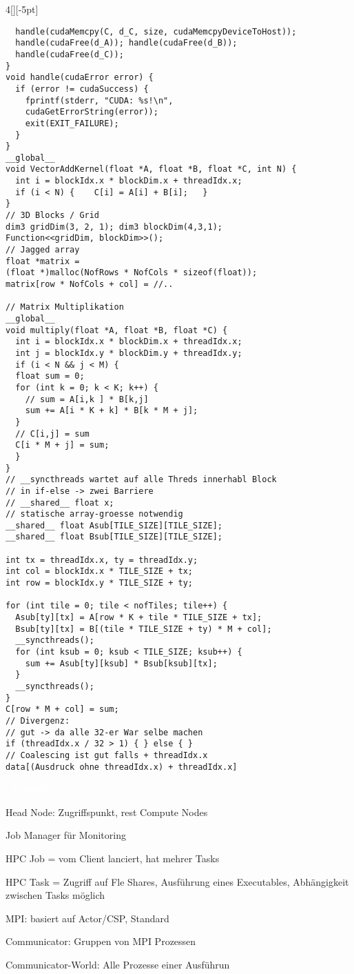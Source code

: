 \documentclass[%
	pdftex,%
	a4paper,%
	landscape,%
	ngerman,
	oneside,%
	6pt,%
	halfparskip,%
]{scrbook}
\newenvironment{mainbox}{%
  \def\FrameCommand{\fboxrule 1px \fcolorbox{black}{spec_blue}}%
  \MakeFramed {\advance\hsize-\width \FrameRestore}}%
 {\endMakeFramed}
\newcommand{\maintopic}[1]{\setcounter{subtopicenum}{0}\setcounter{subsubtopicenum}{0}\vspace{-4px}\begin{mainbox}\textcolor{white}{\textbf{\large{\stepcounter{maintopicenum}\Roman{maintopicenum}. #1}}}\end{mainbox}\vspace{-4px}}
\newenvironment{tight-itemize}
{ \begin{itemize}
    \setlength{\itemsep}{0px}
    \setlength{\parskip}{0px}
    \setlength{\parsep}{0px}  }
{ \end{itemize}                  }
\begin{document}
\begin{multicols}{4}[][-5pt]
\begin{lstlisting}
  handle(cudaMemcpy(C, d_C, size, cudaMemcpyDeviceToHost));
  handle(cudaFree(d_A)); handle(cudaFree(d_B));
  handle(cudaFree(d_C));
}
void handle(cudaError error) {
  if (error != cudaSuccess) {
    fprintf(stderr, "CUDA: %s!\n",
    cudaGetErrorString(error));
    exit(EXIT_FAILURE);
  }
}
__global__
void VectorAddKernel(float *A, float *B, float *C, int N) {
  int i = blockIdx.x * blockDim.x + threadIdx.x;
  if (i < N) {    C[i] = A[i] + B[i];   }
}
// 3D Blocks / Grid
dim3 gridDim(3, 2, 1); dim3 blockDim(4,3,1);
Function<<gridDim, blockDim>>();
// Jagged array
float *matrix =
(float *)malloc(NofRows * NofCols * sizeof(float));
matrix[row * NofCols + col] = //..

// Matrix Multiplikation
__global__
void multiply(float *A, float *B, float *C) {
  int i = blockIdx.x * blockDim.x + threadIdx.x;
  int j = blockIdx.y * blockDim.y + threadIdx.y;
  if (i < N && j < M) {
  float sum = 0;
  for (int k = 0; k < K; k++) {
    // sum = A[i,k ] * B[k,j]
    sum += A[i * K + k] * B[k * M + j];
  }
  // C[i,j] = sum
  C[i * M + j] = sum;
  }
}
// __syncthreads wartet auf alle Threds innerhabl Block
// in if-else -> zwei Barriere
// __shared__ float x;
// statische array-groesse notwendig
__shared__ float Asub[TILE_SIZE][TILE_SIZE];
__shared__ float Bsub[TILE_SIZE][TILE_SIZE];

int tx = threadIdx.x, ty = threadIdx.y;
int col = blockIdx.x * TILE_SIZE + tx;
int row = blockIdx.y * TILE_SIZE + ty;

for (int tile = 0; tile < nofTiles; tile++) {
  Asub[ty][tx] = A[row * K + tile * TILE_SIZE + tx];
  Bsub[ty][tx] = B[(tile * TILE_SIZE + ty) * M + col];
  __syncthreads();
  for (int ksub = 0; ksub < TILE_SIZE; ksub++) {
    sum += Asub[ty][ksub] * Bsub[ksub][tx];
  }
  __syncthreads();
}
C[row * M + col] = sum;
// Divergenz:
// gut -> da alle 32-er War selbe machen
if (threadIdx.x / 32 > 1) { } else { }
// Coalescing ist gut falls + threadIdx.x
data[(Ausdruck ohne threadIdx.x) + threadIdx.x]
\end{lstlisting}
\maintopic{Cluster}
\begin{tight-itemize}
	\item{Head Node: Zugriffspunkt, rest Compute Nodes }
	\item{Job Manager für Monitoring}
	\item{HPC Job = vom Client lanciert, hat mehrer Tasks}
	\item{HPC Task = Zugriff auf Fle Shares, Ausführung eines Executables, Abhängigkeit zwischen Tasks möglich}
	\item{MPI: basiert auf Actor/CSP, Standard}
	\item{Communicator: Gruppen von MPI Prozessen}
	\item{Communicator-World: Alle Prozesse einer Ausführun}
\end{tight-itemize}


\end{multicols}
\end{document}
